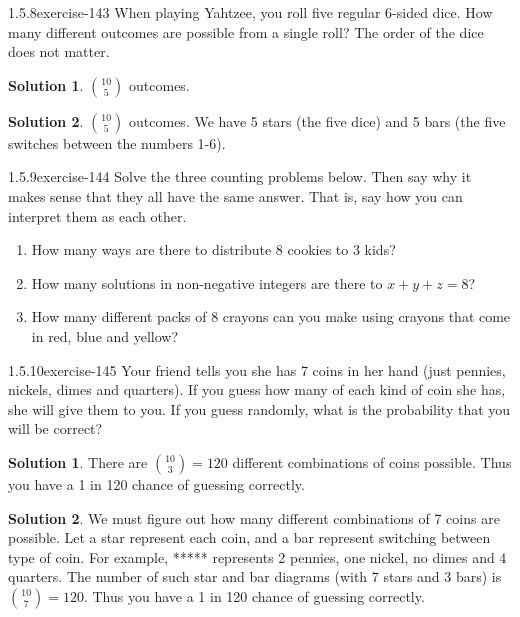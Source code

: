 \documentclass[twoside,11pt,]{book}
\numberwithin{equation}{chapter}
\begin{document}
\begin{divisionsolution}{1.5.8}{}{exercise-143}%
\hypertarget{p-2350}{}%
When playing Yahtzee, you roll five regular 6-sided dice. How many different outcomes are possible from a single roll? The order of the dice does not matter.%
\par\smallskip%
\noindent\textbf{Solution 1}.\quad%
\hypertarget{p-2352}{}%
\({10 \choose 5}\) outcomes.%
\par\smallskip%
\noindent\textbf{Solution 2}.\quad%
\hypertarget{p-2353}{}%
\({10 \choose 5}\) outcomes. We have 5 stars (the five dice) and 5 bars (the five switches between the numbers 1-6).%
\end{divisionsolution}%
\begin{divisionsolution}{1.5.9}{}{exercise-144}%
\hypertarget{p-2354}{}%
Solve the three counting problems below. Then say why it makes sense that they all have the same answer. That is, say how you can interpret them as each other.\leavevmode%
\begin{enumerate}[label=(\alph*)]
\item\hypertarget{li-1441}{}\hypertarget{p-2355}{}%
How many ways are there to distribute 8 cookies to 3 kids?%
\item\hypertarget{li-1442}{}\hypertarget{p-2356}{}%
How many solutions in non-negative integers are there to \(x+y+z = 8\)?%
\item\hypertarget{li-1443}{}\hypertarget{p-2357}{}%
How many different packs of 8 crayons can you make using crayons that come in red, blue and yellow?%
\end{enumerate}
%
\end{divisionsolution}%
\begin{divisionsolution}{1.5.10}{}{exercise-145}%
\hypertarget{p-2362}{}%
Your friend tells you she has 7 coins in her hand (just pennies, nickels, dimes and quarters). If you guess how many of each kind of coin she has, she will give them to you. If you guess randomly, what is the probability that you will be correct?%
\par\smallskip%
\noindent\textbf{Solution 1}.\quad%
\hypertarget{p-2364}{}%
There are \({10 \choose 3} = 120\) different combinations of coins possible. Thus you have a 1 in 120 chance of guessing correctly.%
\par\smallskip%
\noindent\textbf{Solution 2}.\quad%
\hypertarget{p-2365}{}%
We must figure out how many different combinations of 7 coins are possible. Let a star represent each coin, and a bar represent switching between type of coin. For example, **\textbar*\textbar\textbar**** represents 2 pennies, one nickel, no dimes and 4 quarters. The number of such star and bar diagrams (with 7 stars and 3 bars) is \({10 \choose 7} = 120\text{.}\) Thus you have a 1 in 120 chance of guessing correctly.%
\end{divisionsolution}%
\end{document}
